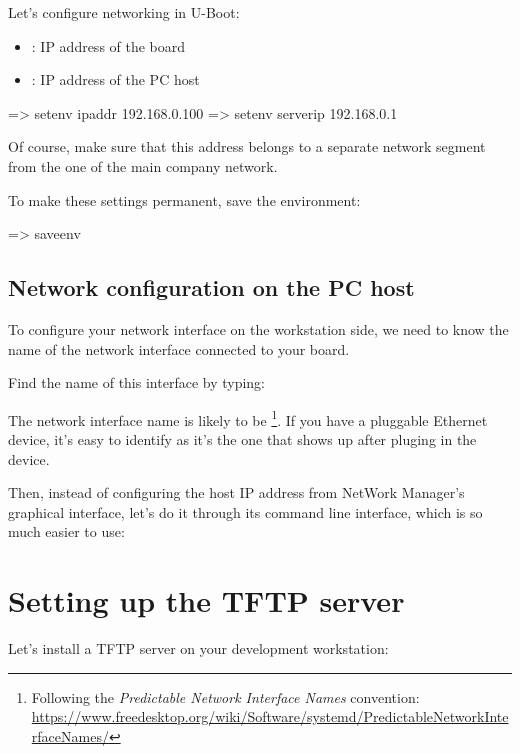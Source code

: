 Let's configure networking in U-Boot:

\begin{itemize}
  \item {}: IP address of the board
  \item {}: IP address of the PC host
\end{itemize}

\begin{ubootinput}
=> setenv ipaddr 192.168.0.100
=> setenv serverip 192.168.0.1
\end{ubootinput}

Of course, make sure that this address belongs to a separate network
segment from the one of the main company network.

To make these settings permanent, save the environment:

\begin{ubootinput}
=> saveenv
\end{ubootinput}

\subsection{Network configuration on the PC host}

To configure your network interface on the workstation side, we need
to know the name of the network interface connected to your board.

Find the name of this interface by typing:

The network interface name is likely to be
\footnote{Following the {\em Predictable Network Interface
Names} convention:
\url{https://www.freedesktop.org/wiki/Software/systemd/PredictableNetworkInterfaceNames/}}.
If you have a pluggable Ethernet device, it's easy to identify as it's
the one that shows up after pluging in the device.

Then, instead of configuring the host IP address from NetWork Manager's
graphical interface, let's do it through its command line interface,
which is so much easier to use:


\section{Setting up the TFTP server}

Let's install a TFTP server on your development workstation:

